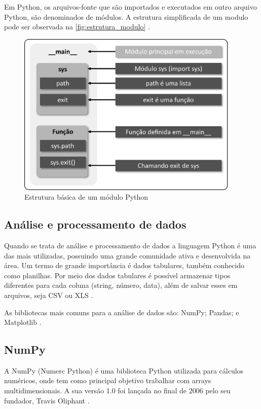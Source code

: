 Em Python, os arquivos-fonte que são importados e executados em outro arquivo Python, são denominados de módulos. A estrutura simplificada de um modulo pode ser observada na \autoref{fig:estrutura_modulo} \cite{ref:borges_2014}.

\begin{figure}[H]
	\centering
	\caption{Estrutura básica de um módulo Python}
	\label{fig:estrutura_modulo}
	\includegraphics[width=10.8cm]{illustrations/figures/estrutura_modulo.pdf}
\end{figure}

\subsection{Análise e processamento de dados}

Quando se trata de análise e processamento de dados a linguagem Python é uma das mais utilizadas, possuindo uma grande comunidade ativa e desenvolvida na área. Um termo de grande importância é dados tabulares, também conhecido como planilhas. Por meio dos dados tabulares é possível armazenar tipos diferentes para cada coluna (string, número, data), além de salvar esses em arquivos, seja CSV ou XLS \cite{ref:mckinney_2022}.

As bibliotecas mais comuns para a análise de dados são: NumPy; Pandas; e Matplotlib \cite{ref:mckinney_2022}.

\subsection{NumPy}

A NumPy (Numerc Python) é uma biblioteca Python utilizada para cálculos numéricos, onde tem como principal objetivo trabalhar com arrays multidimensionais. A sua versão 1.0 foi lançada no final de 2006 pelo seu fundador, Travis Oliphant \cite{ref:oliphant_2006}.

